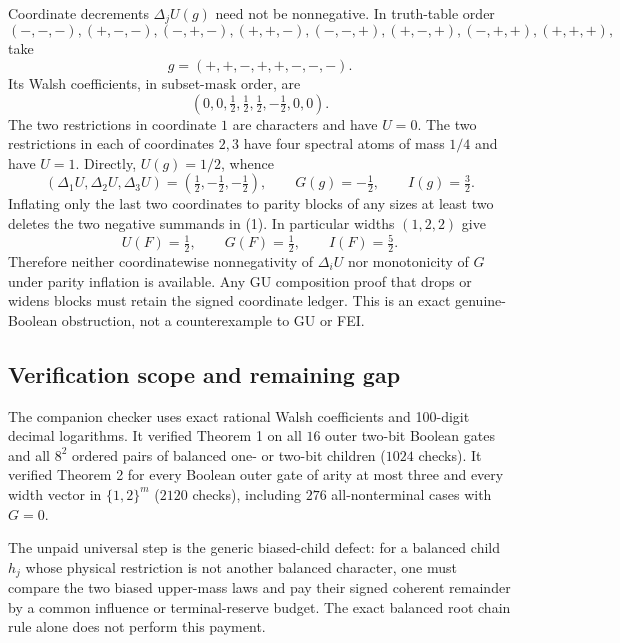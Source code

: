 Coordinate decrements $\Delta_jU(g)$ need not be nonnegative.  In truth-table
order
\[
 (-,-,-),(+,-,-),(-,+,-),(+,+,-),(-,-,+),(+,-,+),(-,+,+),(+,+,+),
\]
take
\[
 g=(+,+,-,+,+,-,-,-).
\]
Its Walsh coefficients, in subset-mask order, are
\[
 (0,0,\tfrac12,\tfrac12,\tfrac12,-\tfrac12,0,0).
\]
The two restrictions in coordinate $1$ are characters and have $U=0$.
The two restrictions in each of coordinates $2,3$ have four spectral atoms
of mass $1/4$ and have $U=1$.  Directly, $U(g)=1/2$, whence
\[
 (\Delta_1U,\Delta_2U,\Delta_3U)
   =(\tfrac12,-\tfrac12,-\tfrac12),
 \qquad G(g)=-\tfrac12,
 \qquad I(g)=\tfrac32.
\]
Inflating only the last two coordinates to parity blocks of any sizes at
least two deletes the two negative summands in (1).  In particular widths
$(1,2,2)$ give
\[
 U(F)=\tfrac12,\qquad G(F)=\tfrac12,\qquad I(F)=\tfrac52.
\]
Therefore neither coordinatewise nonnegativity of $\Delta_iU$ nor monotonicity
of $G$ under parity inflation is available.  Any GU composition proof that
drops or widens blocks must retain the signed coordinate ledger.  This is an
exact genuine-Boolean obstruction, not a counterexample to GU or FEI.

\subsection*{Verification scope and remaining gap}

The companion checker uses exact rational Walsh coefficients and 100-digit
decimal logarithms.  It verified Theorem 1 on all $16$ outer two-bit Boolean
gates and all $8^2$ ordered pairs of balanced one- or two-bit children
($1024$ checks).  It verified Theorem 2 for every Boolean outer gate of arity
at most three and every width vector in $\{1,2\}^m$ ($2120$ checks), including
$276$ all-nonterminal cases with $G=0$.

The unpaid universal step is the generic biased-child defect: for a balanced
child $h_j$ whose physical restriction is not another balanced character,
one must compare the two biased upper-mass laws and pay their signed coherent
remainder by a common influence or terminal-reserve budget.  The exact
balanced root chain rule alone does not perform this payment.
